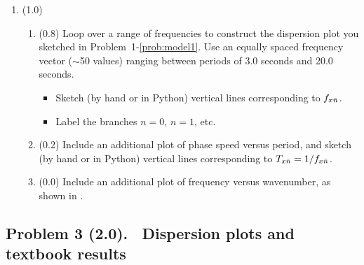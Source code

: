 \documentclass[11pt,titlepage,fleqn]{article}
\begin{document}
\begin{enumerate}
\begin{enumerate}
\item (0.1) List your results in .

\item (0.1) What is the relationship between the number of zero crossings of $W_n(r)$ in the layer and $n$?
\item (0.2) What are the two types of waves (\ie mathematical functions) that are apparent in each $T_n(r)$?
\end{enumerate}


\pagebreak

\item (1.0)
\begin{enumerate}
\item (0.8) Loop over a range of frequencies to construct the dispersion plot you sketched in Problem~1-\ref{prob:model1}. Use an equally spaced frequency vector ($\sim$50 values) ranging between periods of 3.0 seconds and 20.0 seconds.
%
\begin{itemize}
\item Sketch (by hand or in Python) vertical lines corresponding to ${f}_{x\bar{n}}$.
\item Label the branches $n=0$, $n=1$, etc.
\end{itemize}

\item (0.2) Include an additional plot of phase speed versus period, and sketch (by hand or in Python) vertical lines corresponding to ${T}_{x\bar{n}} = 1/{f}_{x\bar{n}}$.

\item (0.0) Include an additional plot of frequency versus wavenumber, as shown in .
\end{enumerate}

\end{enumerate}


\subsection*{Problem 3 (2.0). \ptag\ Dispersion plots and textbook results}
\end{document}
